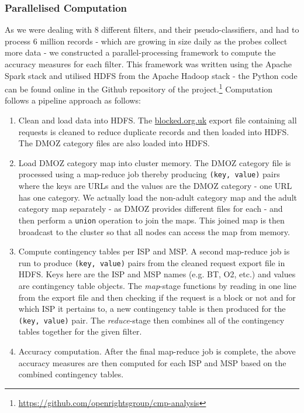 \documentclass{bmcart}
\begin{document}
\subsubsection*{Parallelised Computation}
As we were dealing with 8 different filters, and their pseudo-classifiers, and had to process 6 million records - which are growing in size daily as the probes collect more data - we constructed a parallel-processing framework to compute the accuracy measures for each filter.
This framework was written using the Apache Spark stack and utilised HDFS from the Apache Hadoop stack - the Python code can be found online in the Github repository of the project.\footnote{\url{https://github.com/openrightsgroup/cmp-analysis}}
Computation follows a pipeline approach as follows:
\begin{enumerate}
	\item Clean and load data into HDFS. The \url{blocked.org.uk} export file containing all requests is cleaned to reduce duplicate records and then loaded into HDFS.
	The DMOZ category files are also loaded into HDFS.
	\item Load DMOZ category map into cluster memory. The DMOZ category file is processed using a map-reduce job thereby producing \texttt{(key, value)} pairs where the keys are URLs and the values are the DMOZ category - one URL has one category. 
	We actually load the non-adult category map and the adult category map separately - as DMOZ provides different files for each - and then perform a \texttt{union} operation to join the maps.
	This joined map is then broadcast to the cluster so that all nodes can access the map from memory.
	\item Compute contingency tables per ISP and MSP. A second map-reduce job is run to produce \texttt{(key, value)} pairs from the cleaned request export file in HDFS.
	Keys here are the ISP and MSP names (e.g. BT, O2, etc.) and values are contingency table objects.
	The \textit{map}-stage functions by reading in one line from the export file and then checking if the request is a block or not and for which ISP it pertains to, a new contingency table is then produced for the \texttt{(key, value)} pair.
	The \textit{reduce}-stage then combines all of the contingency tables together for the given filter.
	\item Accuracy computation. After the final map-reduce job is complete, the above accuracy measures are then computed for each ISP and MSP based on the combined contingency tables.
\end{enumerate}
\end{document}
